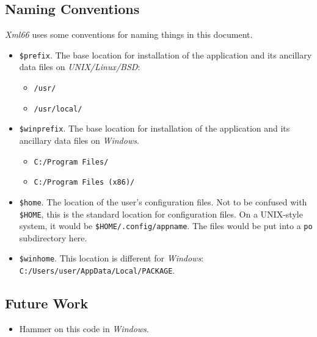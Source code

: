 \documentclass[
 11pt,
 twoside,
 a4paper,
 final                                 %
]{article}
\begin{document}
\subsection{Naming Conventions}
\label{subsec:introduction_conventions}

   \textsl{Xml66} uses some conventions for naming things in this
   document.

   \begin{itemize}
      \item \texttt{\$prefix}. The base location for installation of
         the application and its ancillary data files on
         \textsl{UNIX/Linux/BSD}:
         \begin{itemize}
            \item \texttt{/usr/}
            \item \texttt{/usr/local/}
         \end{itemize}
      \item \texttt{\$winprefix}. The base location for installation of
         the application and its ancillary data files on \textsl{Windows}.
         \begin{itemize}
            \item \texttt{C:/Program Files/}
            \item \texttt{C:/Program Files (x86)/}
         \end{itemize}
      \item \texttt{\$home}. The location of the user's configuration files.
         Not to be confused with \texttt{\$HOME}, this is
         the standard location for configuration files.
         On a UNIX-style system, it would be \linebreak
         \texttt{\$HOME/.config/appname}.
         The files would be put into a \texttt{po} subdirectory here.
      \item \texttt{\$winhome}. This location is different for
         \textsl{Windows}:
         \texttt{C:/Users/user/AppData/Local/PACKAGE}.
   \end{itemize}

\subsection{Future Work}
\label{subsec:introduction_future}

   \begin{itemize}
      \item Hammer on this code in \textsl{Windows}.
   \end{itemize}
\end{document}
